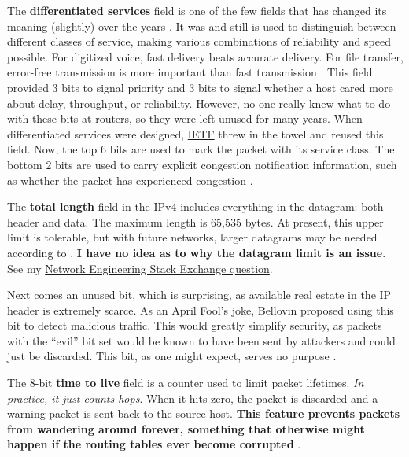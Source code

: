 \documentclass[12pt, oneside]{book}
\begin{document}
The \textbf{differentiated services} field is one of the few fields that has changed its meaning (slightly) over the years \cite{computer-networks-tanenbaum-2012}.
It was and still is used to distinguish between different classes of service, making various combinations of reliability and speed possible.
For digitized voice, fast delivery beats accurate delivery.
For file transfer, error-free transmission is more important than fast transmission \cite{computer-networks-tanenbaum-2012}.
This field provided 3 bits to signal priority and 3 bits to signal whether a host cared more about delay, throughput, or reliability.
However, no one really knew what to do with these bits at routers, so they were left unused for many years.
When differentiated services were designed, \href{https://en.wikipedia.org/wiki/Internet_Engineering_Task_Force}{IETF} threw in the towel and reused this field.
Now, the top 6 bits are used to mark the packet with its service class.
The bottom 2 bits are used to carry explicit congestion notification information, such as whether the packet has experienced congestion \cite{computer-networks-tanenbaum-2012}.

The \textbf{total length} field in the IPv4 includes everything in the datagram: both header and data.
The maximum length is 65,535 bytes. At present, this upper limit is tolerable, but with future networks, larger datagrams may be needed according to \cite{computer-networks-tanenbaum-2012}.
\textbf{I have no idea as to why the datagram limit is an issue}.
See my \href{https://networkengineering.stackexchange.com/questions/54480/why-is-the-ip-datagram-total-length-an-issue}{Network Engineering Stack Exchange question}.

Next comes an unused bit, which is surprising, as available real estate in the IP header is extremely scarce.
As an April Fool's joke, Bellovin proposed using this bit to detect malicious traffic.
This would greatly simplify security, as packets with the ``evil'' bit set would be known to have been sent by attackers and could just be discarded.
This bit, as one might expect, serves no purpose \cite{computer-networks-tanenbaum-2012}.

The 8-bit \textbf{time to live} field is a counter used to limit packet lifetimes.
\textit{In practice, it just counts hops}.
When it hits zero, the packet is discarded and a warning packet is sent back to the source host.
\textbf{This feature prevents packets from wandering around forever, something that otherwise might happen if the routing tables ever become corrupted} \cite{computer-networks-tanenbaum-2012}.
\end{document}
